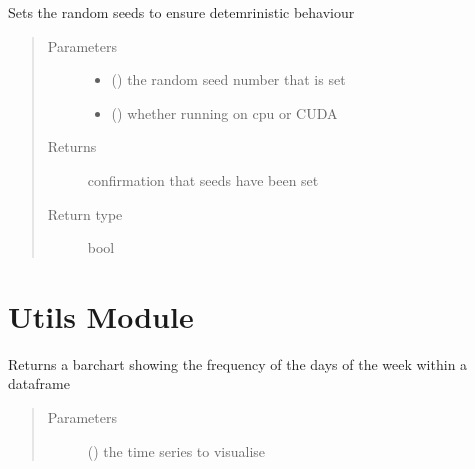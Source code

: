 \documentclass[letterpaper,10pt,english]{sphinxmanual}
\begin{document}

\begin{fulllineitems}
\label{\detokenize{index:Src.deeplearning.set_seed}}
Sets the random seeds to ensure detemrinistic behaviour
\begin{quote}\begin{description}
\item[{Parameters}] \leavevmode\begin{itemize}
\item {} 
 () \textendash{} the random seed number that is set

\item {} 
 () \textendash{} whether running on cpu or CUDA

\end{itemize}

\item[{Returns}] \leavevmode
confirmation that seeds have been set

\item[{Return type}] \leavevmode
bool

\end{description}\end{quote}

\end{fulllineitems}



\chapter{Utils Module}
\label{\detokenize{index:module-Src.utils}}\label{\detokenize{index:utils-module}}

\begin{fulllineitems}
\label{\detokenize{index:Src.utils.check_day_frequency}}
Returns a barchart showing the frequency of the
days of the week within a dataframe
\begin{quote}\begin{description}
\item[{Parameters}] \leavevmode
{} () \textendash{} the time series to visualise

\end{description}\end{quote}

\end{fulllineitems}
\end{document}
